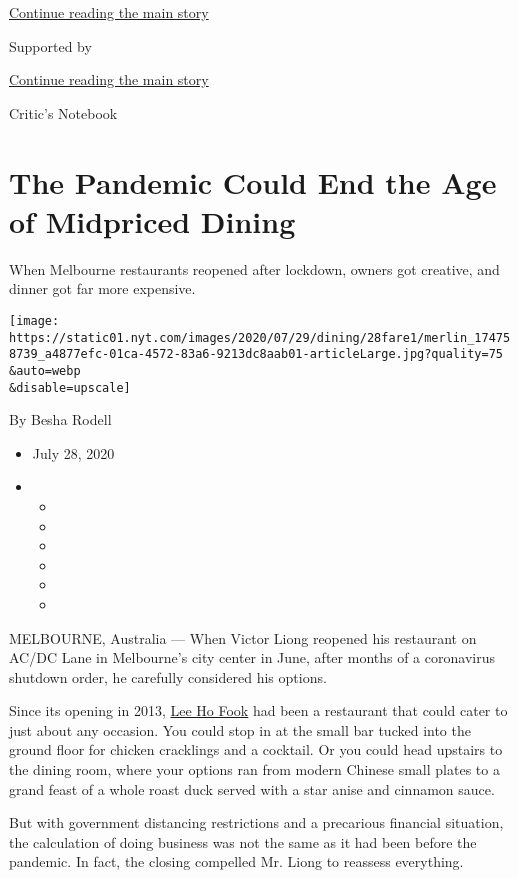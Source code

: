 \protect\hyperlink{after-top}{Continue reading the main story}

Supported by

\protect\hyperlink{after-sponsor}{Continue reading the main story}

Critic's Notebook

\hypertarget{the-pandemic-could-end-the-age-of-midpriced-dining}{%
\section{The Pandemic Could End the Age of Midpriced
Dining}\label{the-pandemic-could-end-the-age-of-midpriced-dining}}

When Melbourne restaurants reopened after lockdown, owners got creative,
and dinner got far more expensive.

\texttt{[image: https://static01.nyt.com/images/2020/07/29/dining/28fare1/merlin\_174758739\_a4877efc-01ca-4572-83a6-9213dc8aab01-articleLarge.jpg?quality=75\\\&auto=webp\\\&disable=upscale]}

By Besha Rodell

\begin{itemize}
\item
  July 28, 2020
\item
  \begin{itemize}
  \item
  \item
  \item
  \item
  \item
  \item
  \end{itemize}
\end{itemize}

MELBOURNE, Australia --- When Victor Liong reopened his restaurant on
AC/DC Lane in Melbourne's city center in June, after months of a
coronavirus shutdown order, he carefully considered his options.

Since its opening in 2013, \href{https://www.leehofook.com.au/}{Lee Ho
Fook} had been a restaurant that could cater to just about any occasion.
You could stop in at the small bar tucked into the ground floor for
chicken cracklings and a cocktail. Or you could head upstairs to the
dining room, where your options ran from modern Chinese small plates to
a grand feast of a whole roast duck served with a star anise and
cinnamon sauce.

But with government distancing restrictions and a precarious financial
situation, the calculation of doing business was not the same as it had
been before the pandemic. In fact, the closing compelled Mr. Liong to
reassess everything.

